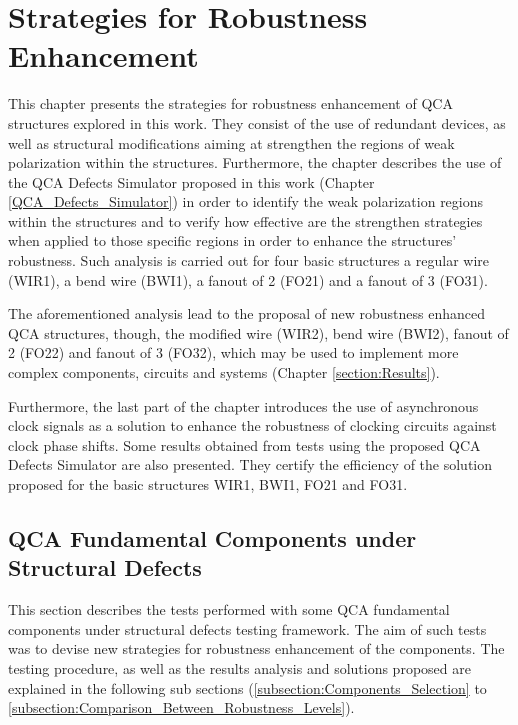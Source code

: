 \chapter{Strategies for Robustness Enhancement}
\label{section:Strategies_for_Robustness_Enhancement}

This chapter presents the strategies for robustness enhancement of QCA structures explored in this work. They consist of the use of redundant devices, as well as structural modifications aiming at strengthen the regions of weak polarization within the structures. Furthermore, the chapter describes the use of the QCA Defects Simulator proposed in this work (Chapter \ref{QCA_Defects_Simulator}) in order to identify the weak polarization regions within the structures and to verify how effective are the strengthen strategies when applied to those specific regions in order to enhance the structures' robustness. Such analysis is carried out for four basic structures \textemdash a regular wire (WIR1), a bend wire (BWI1), a fanout of 2 (FO21) and a fanout of 3 (FO31).

The aforementioned analysis lead to the proposal of new robustness enhanced QCA structures, though, the modified wire (WIR2), bend wire (BWI2), fanout of 2 (FO22) and fanout of 3 (FO32), which may be used to implement more complex components, circuits and systems (Chapter \ref{section:Results}).

Furthermore, the last part of the chapter introduces the use of asynchronous clock signals as a solution to enhance the robustness of clocking circuits against clock phase shifts. Some results obtained from tests using the proposed QCA Defects Simulator are also presented. They certify the efficiency of the solution proposed for the basic structures WIR1, BWI1, FO21 and FO31.

\section{QCA Fundamental Components under Structural Defects}

This section describes the tests performed with some QCA fundamental components under structural defects testing framework. The aim of such tests was to devise new strategies for robustness enhancement of the components. The testing procedure, as well as the results analysis and solutions proposed are explained in the following sub sections (\ref{subsection:Components_Selection} to \ref{subsection:Comparison_Between_Robustness_Levels}).

